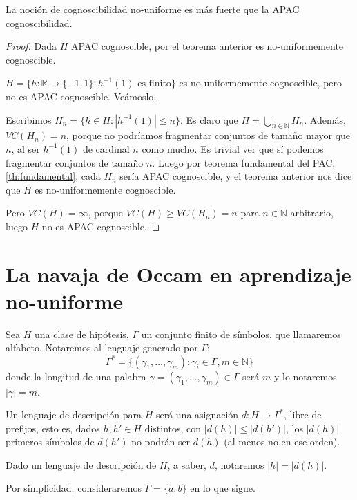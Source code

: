 \begin{corollary}
 La noción de cognoscibilidad no-uniforme es más fuerte que la APAC cognoscibilidad.
\end{corollary}
\begin{proof}
 Dada $H$ APAC cognoscible, por el teorema anterior es no-uniformemente cognoscible.
 
 $H = \{h:\mathbb{R} \rightarrow \{-1,1\} : h^{-1}(1) \textrm{ es finito}\}$ es no-uniformemente cognoscible, pero no es
 APAC cognoscible. Veámoslo.
 
 Escribimos $H_n = \{h\in H: |h^{-1}(1)| \le n\}$. Es claro que $H=\bigcup_{n\in \mathbb{N}} H_n$. Además, $VC(H_n) = n$,
 porque no podríamos fragmentar conjuntos de tamaño mayor que $n$, al ser $h^{-1}(1)$ de cardinal $n$ como mucho. Es trivial
 ver que sí podemos fragmentar conjuntos de tamaño $n$. Luego por teorema fundamental del PAC, \ref{th:fundamental}, 
 cada $H_n$ sería APAC cognoscible, y el teorema anterior nos dice que $H$ es no-uniformemente cognoscible.
 
 Pero $VC(H) = \infty$, porque $VC(H) \ge VC(H_n) = n$ para $n\in \mathbb{N}$ arbitrario, luego $H$ no es APAC cognoscible.
\end{proof}
  
\section{La navaja de Occam en aprendizaje no-uniforme}
\begin{definition}
 Sea $H$ una clase de hipótesis, $\Gamma$ un conjunto finito de símbolos, que llamaremos alfabeto. Notaremos 
 al lenguaje generado por $\Gamma$:
 \[
   \Gamma^{\ast} = \{(\gamma_1, \ldots, \gamma_m): \gamma_i \in \Gamma, m\in \mathbb{N}\}
 \]
 donde la longitud de una palabra $\gamma = (\gamma_1, \ldots, \gamma_m) \in \Gamma$ será $m$ y lo notaremos $|\gamma| = m$.
 
 Un lenguaje de descripción para $H$ será una asignación $d: H \rightarrow \Gamma^{\ast}$, libre de prefijos,
 esto es, dados $h,h'\in H$ distintos, con $|d(h)| \le |d(h')|$, los $|d(h)|$ primeros símbolos de $d(h')$
 no podrán ser $d(h)$ (al menos no en ese orden).
 
 Dado un lenguaje de descripción de $H$, a saber, $d$, notaremos $|h| = |d(h)|$.
\end{definition}

Por simplicidad, consideraremos $\Gamma = \{a,b\}$ en lo que sigue.

